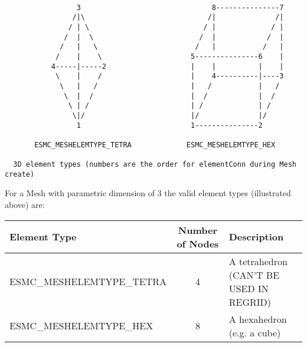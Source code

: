 \begin{verbatim}
                                            
                 3                               8---------------7
                /|\                             /|              /|
               / | \                           / |             / |
              /  |  \                         /  |            /  |
             /   |   \                       /   |           /   |
            /    |    \                     5---------------6    |
           4-----|-----2                    |    |          |    |
            \    |    /                     |    4----------|----3
             \   |   /                      |   /           |   /
              \  |  /                       |  /            |  /
               \ | /                        | /             | /
                \|/                         |/              |/
                 1                          1---------------2

       ESMC_MESHELEMTYPE_TETRA             ESMC_MESHELEMTYPE_HEX  

  3D element types (numbers are the order for elementConn during Mesh create)

\end{verbatim}

For a Mesh with parametric dimension of 3 the valid element types (illustrated above) are:

\smallskip

\begin{tabular}{|l|c|l|}
\hline
Element Type & Number of Nodes & Description \\
\hline
ESMC\_MESHELEMTYPE\_TETRA & 4 & A tetrahedron (CAN'T BE USED IN REGRID) \\
ESMC\_MESHELEMTYPE\_HEX  & 8 & A hexahedron (e.g. a cube) \\
\hline
\end{tabular}


